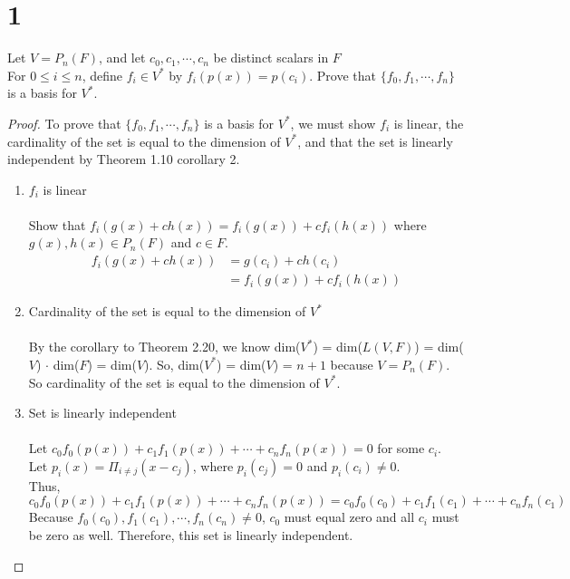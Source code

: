\documentclass[11pt]{scrartcl}
\begin{document}
\section{1}
Let $V = P_n(F)$, and let $c_0, c_1, \cdots, c_n$ be distinct scalars in $F$\\
For $0 \leq i \leq n$, define $f_i \in V^*$ by $f_i(p(x)) = p(c_i)$. Prove that 
$\{f_0, f_1, \cdots, f_n\}$ is a basis for $V^*$.
\begin{proof}
	To prove that $\{f_0, f_1, \cdots, f_n\}$ is a basis for $V^*$, we must show
	$f_i$ is linear, the cardinality of the set is equal to the dimension of
	$V^*$, and that the set is linearly independent by Theorem 1.10 corollary 2.
	\begin{enumerate}[label=\roman*.]
	\item{
		$f_i$ is linear\\
		\-\\
		Show that $f_i(g(x) + ch(x)) = f_i(g(x)) + cf_i(h(x))$ 
		where $g(x), h(x) \in P_n(F)$ and $c \in F$.
	\begin{align*}	
	f_i(g(x) + ch(x)) &= g(c_i) + ch(c_i)\\
	&= f_i(g(x)) + cf_i(h(x))
	\end{align*}
	}
	\item{
		Cardinality of the set is equal to the dimension of	$V^*$ \\
		\-\\
		By the corollary to Theorem 2.20, we know dim($V^*$) = dim($L(V,F)$) = 
		dim($V$) $\cdot$ dim($F$) = dim($V$). So, dim($V^*$) = dim($V$) = $n + 1$ because $V = P_n(F)$.
		So cardinality of the set is equal to the dimension of $V^*$.
	}
	\item{
		Set is linearly independent\\
		\-\\
		Let $c_0f_0(p(x)) + c_1f_1(p(x)) + \cdots + c_nf_n(p(x)) = 0$ for some $c_i$. \\
		Let $p_i(x) = \Pi_{i \neq j}(x-c_j)$, where $p_i(c_j) = 0$ and $p_i(c_i) \neq 0$.\\
		Thus, $c_0f_0(p(x)) + c_1f_1(p(x)) + \cdots + c_nf_n(p(x)) =
		c_0f_0(c_0) + c_1f_1(c_1) + \cdots + c_nf_n(c_1)$\\
		Because $f_0(c_0), f_1(c_1), \cdots, f_n(c_n) \neq 0$, $c_0$ must equal zero and 
		all $c_i$ must be zero as well. Therefore, this set is linearly independent.
	}
	\end{enumerate}
\end{proof}
\end{document}

